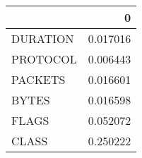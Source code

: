 \begin{tabular}{lr}
\toprule
{} &         0 \\
\midrule
DURATION &  0.017016 \\
PROTOCOL &  0.006443 \\
PACKETS  &  0.016601 \\
BYTES    &  0.016598 \\
FLAGS    &  0.052072 \\
CLASS    &  0.250222 \\
\bottomrule
\end{tabular}
